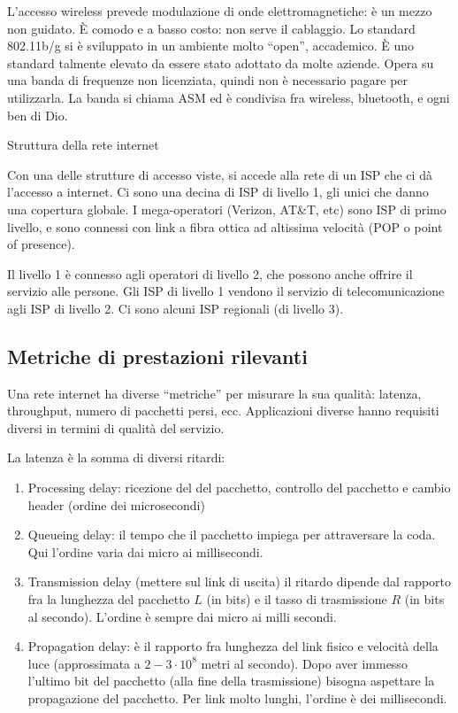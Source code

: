 L'accesso wireless prevede modulazione di onde elettromagnetiche: \`e un mezzo non guidato. \`E comodo e a basso costo: non serve il cablaggio. Lo standard 802.11b/g si \`e sviluppato in un ambiente molto ``open'', accademico. \`E uno standard talmente elevato da essere stato adottato da molte aziende. Opera su una banda di frequenze non licenziata, quindi non \`e necessario pagare per utilizzarla. La banda si chiama ASM ed \`e condivisa fra wireless, bluetooth, e ogni ben di Dio.

Struttura della rete internet

Con una delle strutture di accesso viste, si accede alla rete di un ISP che ci d\`a l'accesso a internet. Ci sono una decina di ISP di livello 1, gli unici che danno una copertura globale. I mega-operatori (Verizon, AT\&T, etc) sono ISP di primo livello, e sono connessi con link a fibra ottica ad altissima velocit\`a (POP o point of presence).

Il livello 1 \`e connesso agli operatori di livello 2, che possono anche offrire il servizio alle persone. Gli ISP di livello 1 vendono il servizio di telecomunicazione agli ISP di livello 2. Ci sono alcuni ISP regionali (di livello 3).

\subsection{Metriche di prestazioni rilevanti}

Una rete internet ha diverse ``metriche'' per misurare la sua qualit\`a: latenza, throughput, numero di pacchetti persi, ecc. Applicazioni diverse hanno requisiti diversi in termini di qualit\`a del servizio.

La latenza \`e la somma di diversi ritardi:
\begin{enumerate}
    \item Processing delay: ricezione del del pacchetto, controllo del pacchetto e cambio header (ordine dei microsecondi)
    \item Queueing delay: il tempo che il pacchetto impiega per attraversare la coda. Qui l'ordine varia dai micro ai millisecondi.
    \item Transmission delay (mettere sul link di uscita) il ritardo dipende dal rapporto fra la lunghezza del pacchetto $L$ (in bits) e il tasso di trasmissione $R$ (in bits al secondo). L'ordine \`e sempre dai micro ai milli secondi. 
    \item Propagation delay: \`e il rapporto fra lunghezza del link fisico e velocit\`a della luce (approssimata a $2-3 \cdot 10^8$ metri al secondo). Dopo aver immesso l'ultimo bit del pacchetto (alla fine della trasmissione) bisogna aspettare la propagazione del pacchetto. Per link molto lunghi, l'ordine \`e dei millisecondi.
\end{enumerate}


